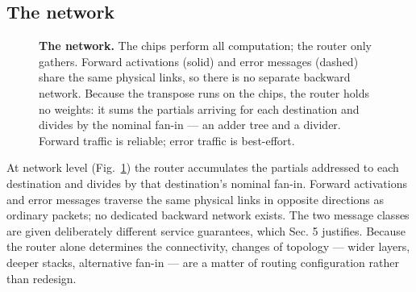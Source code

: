 \documentclass[11pt]{article}
\newcommand{\bdelta}{\bm\delta}
\begin{document}
\hypertarget{sec:network}{%
\subsection{The network}\label{sec:network}}

\begin{figure}[t]
\centering
{}
\caption{\textbf{The network.} The chips perform all computation; the router only gathers. Forward
activations (solid) and error messages (dashed) share the same physical links, so there is no
separate backward network. Because the transpose runs on the chips, the router holds no weights: it
sums the partials arriving for each destination and divides by the nominal fan-in --- an adder tree
and a divider. Forward traffic is reliable; error traffic is best-effort.}
\label{fig:net}
\end{figure}

At network level (Fig.~\ref{fig:net}) the router accumulates the partials addressed
to each destination and divides by that destination's nominal fan-in.
Forward activations and error messages traverse the same physical links
in opposite directions as ordinary packets; no dedicated backward
network exists. The two message classes are given deliberately different
service guarantees, which Sec. 5 justifies. Because the router alone
determines the connectivity, changes of topology --- wider layers,
deeper stacks, alternative fan-in --- are a matter of routing
configuration rather than redesign.
\end{document}

